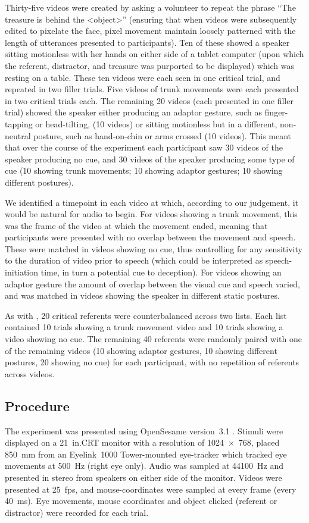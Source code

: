 \documentclass[a4paper,man,natbib]{apa6}
\newcommand*{\spex}[1]{``{#1}''} %
\begin{document}
Thirty-five videos were created by asking a volunteer to repeat the phrase \spex{The treasure is behind the <object>} (ensuring that when videos were subsequently edited to pixelate the face, pixel movement maintain loosely patterned with the length of utterances presented to participants).
Ten of these showed a speaker sitting motionless with her hands on either side of a tablet computer (upon which the referent, distractor, and treasure was purported to be displayed) which was resting on a table.
These ten videos were each seen in one critical trial, and repeated in two filler trials.
Five videos of trunk movements were each presented in two critical trials each.
The remaining 20 videos (each presented in one filler trial) showed the speaker either producing an adaptor gesture, such as finger-tapping or head-tilting, (10 videos) or sitting motionless but in a different, non-neutral posture, such as hand-on-chin or arms crossed (10 videos).
This meant that over the course of the experiment each participant saw 30 videos of the speaker producing no cue, and 30 videos of the speaker producing some type of cue (10 showing trunk movements; 10 showing adaptor gestures; 10 showing different postures).

We identified a timepoint in each video at which, according to our judgement, it would be natural for audio to begin. 
For videos showing a trunk movement, this was the frame of the video at which the movement ended, meaning that participants were presented with no overlap between the movement and speech.
These were matched in videos showing no cue, thus controlling for any sensitivity to the duration of video prior to speech (which could be interpreted as speech-initiation time, in turn a potential cue to deception). 
For videos showing an adaptor gesture the amount of overlap between the visual cue and speech varied, and was matched in videos showing the speaker in different static postures.

As with \citet{Loy2017}, 20 critical referents were counterbalanced across two lists. 
Each list contained 10 trials showing a trunk movement video and 10 trials showing a video showing no cue.
The remaining 40 referents were randomly paired with one of the remaining videos (10 showing adaptor gestures, 10 showing different postures, 20 showing no cue) for each participant, with no repetition of referents across videos.

\subsection{Procedure}
The experiment was presented using OpenSesame version~3.1 \citep{Mathot2012}.
Stimuli were displayed on a 21~in.\@ CRT monitor with a resolution of 1024~$\times$~768, placed 850~mm from an Eyelink~1000 Tower-mounted eye-tracker which tracked eye movements at 500~Hz (right eye only). 
Audio was sampled at 44100~Hz and presented in stereo from speakers on either side of the monitor. 
Videos were presented at 25~fps, and mouse-coordinates were sampled at every frame (every 40~ms).
Eye movements, mouse coordinates and object clicked (referent or distractor) were recorded for each trial.
\end{document}
